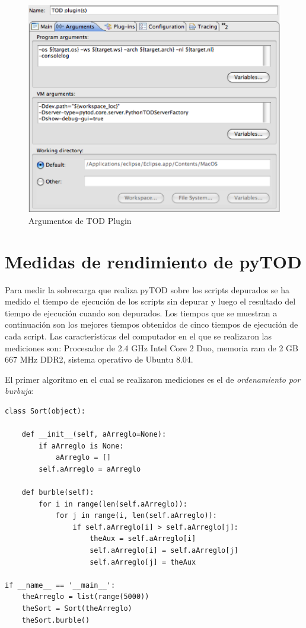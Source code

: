 \documentclass[12pt,legalpaper]{report}
\begin{document}
\begin{itemize}
\begin{itemize}
\begin{figure}[h]
	\centering
	\includegraphics[scale=0.5]{images/aspectoFuncionamiento/argsTODPlugin.eps}
	\caption{Argumentos de TOD Plugin}
\end{figure}
	\end{itemize}	
\end{itemize}
	
	\section{Medidas de rendimiento de pyTOD}
	
Para medir la sobrecarga que realiza pyTOD sobre los scripts depurados se ha medido el tiempo de ejecución de los scripts sin depurar y luego el resultado del tiempo de ejecución cuando son depurados.  Los tiempos que se muestran a continuación son los mejores tiempos obtenidos de cinco tiempos de ejecución de cada script.  Las características del computador en el que se realizaron las mediciones son: Procesador de 2.4 GHz Intel Core 2 Duo, memoria ram de 2 GB 667 MHz DDR2, sistema operativo de Ubuntu 8.04.

El primer algoritmo en el cual se realizaron mediciones es el de \textit{ordenamiento por burbuja}:

\begin{singlespace}
\begin{lstlisting}[style=Python]
class Sort(object):
    
    def __init__(self, aArreglo=None):
        if aArreglo is None:
            aArreglo = []
        self.aArreglo = aArreglo
    
    def burble(self):
        for i in range(len(self.aArreglo)):
            for j in range(i, len(self.aArreglo)):
                if self.aArreglo[i] > self.aArreglo[j]:
                    theAux = self.aArreglo[i]
                    self.aArreglo[i] = self.aArreglo[j]
                    self.aArreglo[j] = theAux
    
if __name__ == '__main__':
    theArreglo = list(range(5000))
    theSort = Sort(theArreglo)
    theSort.burble()
\end{lstlisting}
\end{singlespace}	
\end{document}
